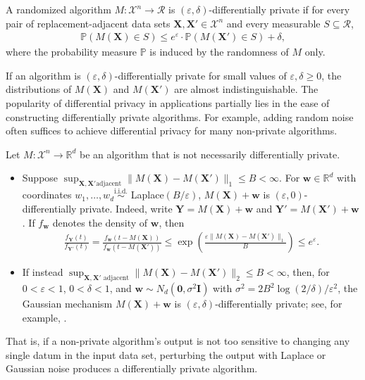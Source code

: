 \documentclass[letterpaper,12pt]{article}
\numberwithin{equation}{section}
\theoremstyle{plain}
\numberwithin{Theorem}{section}
\numberwithin{proposition}{section}
\numberwithin{Lemma}{section}
{
	\theoremstyle{definition}
	\newtheorem{Definition}{Definition}
	\newtheorem{example}{Example}
	\numberwithin{example}{section}
	\newtheorem{fact}{Fact}
	\numberwithin{fact}{section}
	\newtheorem{remark}{Remark}
}
\newcommand{\furtherrev}[1]{#1}
\newcommand{\Pro}{\mathbb{P}}
\newcommand{\1}{\mathbbm{1}}
\def\R{{\mathbb R}}
\begin{document}
\begin{Definition}\label{def: differential privacy}
	A randomized algorithm $M: \mathcal X^n \to \mathcal R$ is $(\varepsilon, \delta)$-differentially private if for every pair of \furtherrev{replacement-adjacent} data sets $\bm X, \bm X' \in \mathcal X^n$ and every measurable $S \subseteq \mathcal R$, 
	\begin{align*}
		\Pro\left(M(\bm X) \in S\right) \leq e^\varepsilon \cdot \Pro\left(M(\bm X') \in S\right) + \delta,
	\end{align*}
	where the probability measure $\Pro$ is induced by the randomness of $M$ only.
\end{Definition}

If an algorithm is $(\varepsilon, \delta)$-differentially private for small values of $\varepsilon, \delta \geq 0$, the distributions of $M(\bm X)$ and $M(\bm X')$ are almost indistinguishable. 
The popularity of differential privacy in applications partially lies in the ease of constructing differentially private algorithms. For example, adding random noise often suffices to achieve differential privacy for many non-private algorithms.
\begin{example} \label{fc: laplace and gaussian mechanisms}
	Let $M: \mathcal X^n \to \R^d$ be an algorithm that is not necessarily differentially private.
	\begin{itemize}
			\item Suppose $\sup_{\bm X, \bm X' \text{adjacent}} \|M(\bm X) - M(\bm X')\|_1 \leq B < \infty$. For $\bm w \in \R^d$ with coordinates $w_1,\ldots,w_d \stackrel{\text{i.i.d.}}{\sim}$ Laplace$(B/\varepsilon)$, $M(\bm X) + \bm w$ is $(\varepsilon, 0)$-differentially private. Indeed, write $\bm Y=M(\bm X)+\bm w$ and $\bm Y'=M(\bm X')+\bm w$. If $f_{\bm w}$ denotes the density of $\bm w$, then
		\begin{align*}
				\frac{f_{\bm Y}(t)}{f_{\bm Y'}(t)} = \frac{f_{\bm w}(t - M(\bm X))}{f_{\bm w}(t - M(\bm X'))} \leq \exp\left(\frac{\varepsilon \|M(\bm X) - M(\bm X')\|_1}{B}\right) \leq e^\varepsilon.
		\end{align*}
			\item If instead $\sup_{\bm X, \bm X' \text{ adjacent}} \|M(\bm X) - M(\bm X')\|_2 \leq B < \infty$, then, for $0<\varepsilon<1$, $0<\delta<1$, and $\bm w \sim N_d(\bm 0, \sigma^2\bm I)$ with $\sigma^2 = 2B^2\log(2/\delta)/\varepsilon^2$, the Gaussian mechanism $M(\bm X) + \bm w$ is $(\varepsilon, \delta)$-differentially private; see, for example, \cite{dwork2014algorithmic}.
	\end{itemize}
		That is, if a non-private algorithm's output is not too sensitive to changing any single datum in the input data set, perturbing the output with Laplace or Gaussian noise produces a differentially private algorithm. 
\end{example}
\end{document}
